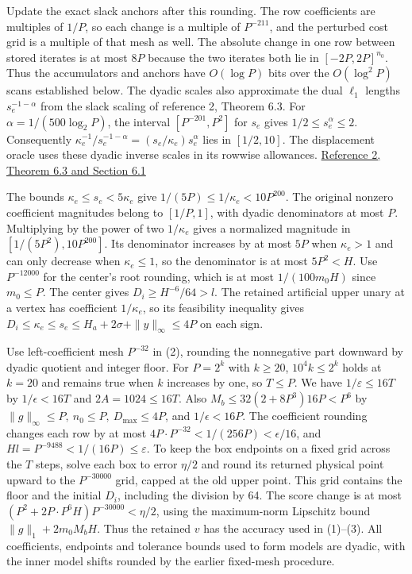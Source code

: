 \documentclass[11pt]{article}
\begin{document}
Update the exact slack anchors after this rounding. The row coefficients are multiples of \(1/P\), so each change is a multiple of \(P^{-211}\), and the perturbed cost grid is a multiple of that mesh as well. The absolute change in one row between stored iterates is at most \(8P\) because the two iterates both lie in \([-2P,2P]^{n_0}\). Thus the accumulators and anchors have \(O(\log P)\) bits over the \(O(\log^2 P)\) scans established below. The dyadic scales also approximate the dual \(\ell_1\) lengths \(s_e^{-1-\alpha}\) from the slack scaling of reference 2, Theorem 6.3. For \(\alpha=1/(500\log_2 P)\), the interval \([P^{-201},P^2]\) for \(s_e\) gives \(1/2\le s_e^\alpha\le2\). Consequently \(\kappa_e^{-1}/s_e^{-1-\alpha}=(s_e/\kappa_e)s_e^\alpha\) lies in \([1/2,10]\). The displacement oracle uses these dyadic inverse scales in its rowwise allowances. \href{https://arxiv.org/pdf/2407.10830v1}{Reference 2, Theorem 6.3 and Section 6.1}

The bounds \(\kappa_e\le s_e<5\kappa_e\) give \(1/(5P)\le1/\kappa_e<10P^{200}\). The original nonzero coefficient magnitudes belong to \([1/P,1]\), with dyadic denominators at most \(P\). Multiplying by the power of two \(1/\kappa_e\) gives a normalized magnitude in \([1/(5P^2),10P^{200}]\). Its denominator increases by at most \(5P\) when \(\kappa_e>1\) and can only decrease when \(\kappa_e\le1\), so the denominator is at most \(5P^2<H\). Use \(P^{-12000}\) for the center's root rounding, which is at most \(1/(100m_0H)\) since \(m_0\le P\). The center gives \(D_i\ge H^{-6}/64>l\). The retained artificial upper unary at a vertex has coefficient \(1/\kappa_e\), so its feasibility inequality gives \(D_i\le\kappa_e\le s_e\le H_a+2\sigma+\|y\|_\infty\le4P\) on each sign.

Use left-coefficient mesh \(P^{-32}\) in (2), rounding the nonnegative part downward by dyadic quotient and integer floor. For \(P=2^k\) with \(k\ge20\), \(10^4k\le2^k\) holds at \(k=20\) and remains true when \(k\) increases by one, so \(T\le P\). We have \(1/\varepsilon\le16T\) by \(1/\epsilon<16T\) and \(2A=1024\le16T\). Also \(M_b\le32(2+8P^3)16P<P^6\) by \(\|g\|_\infty\le P,\ n_0\le P,\ D_{\max}\le4P\), and \(1/\epsilon<16P\). The coefficient rounding changes each row by at most \(4P\cdot P^{-32}<1/(256P)<\epsilon/16\), and \(Hl=P^{-9488}<1/(16P)\le\varepsilon\). To keep the box endpoints on a fixed grid across the \(T\) steps, solve each box to error \(\eta/2\) and round its returned physical point upward to the \(P^{-30000}\) grid, capped at the old upper point. This grid contains the floor and the initial \(D_i\), including the division by 64. The score change is at most \((P^2+2P\cdot P^6H)P^{-30000}<\eta/2\), using the maximum-norm Lipschitz bound \(\|g\|_1+2m_0M_bH\). Thus the retained \(v\) has the accuracy used in (1)--(3). All coefficients, endpoints and tolerance bounds used to form models are dyadic, with the inner model shifts rounded by the earlier fixed-mesh procedure.
\end{document}
